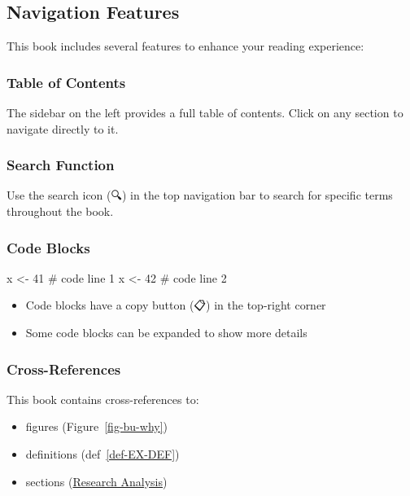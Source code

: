 \documentclass[
  american,
  10,
  a4paper,
]{book}
\newenvironment{Shaded}{\begin{snugshade}}{\end{snugshade}}
\newcommand{\CommentTok}[1]{\textcolor[rgb]{0.37,0.37,0.37}{#1}}
\newcommand{\DecValTok}[1]{\textcolor[rgb]{0.68,0.00,0.00}{#1}}
\newcommand{\NormalTok}[1]{\textcolor[rgb]{0.00,0.23,0.31}{#1}}
\newcommand{\OtherTok}[1]{\textcolor[rgb]{0.00,0.23,0.31}{#1}}
\providecommand{\tightlist}{%
  \setlength{\itemsep}{0pt}\setlength{\parskip}{0pt}}
\theoremstyle{definition}
\theoremstyle{remark}
\begin{document}
\subsection{Navigation Features}\label{navigation-features}

This book includes several features to enhance your reading experience:

\subsubsection{Table of Contents}\label{table-of-contents}

The sidebar on the left provides a full table of contents. Click on any
section to navigate directly to it.

\subsubsection{Search Function}\label{search-function}

Use the search icon (🔍) in the top navigation bar to search for
specific terms throughout the book.

\subsubsection{Code Blocks}\label{code-blocks}

\begin{Shaded}
\begin{Highlighting}[]
\NormalTok{x }\OtherTok{\textless{}{-}} \DecValTok{41}   \CommentTok{\# code line 1}
\NormalTok{x }\OtherTok{\textless{}{-}} \DecValTok{42}   \CommentTok{\# code line 2}
\end{Highlighting}
\end{Shaded}

\begin{itemize}
\tightlist
\item
  Code blocks have a copy button (📋) in the top-right corner
\item
  Some code blocks can be expanded to show more details
\end{itemize}

\subsubsection{Cross-References}\label{cross-references}

This book contains cross-references to:

\begin{itemize}
\tightlist
\item
  figures (Figure~\ref{fig-bu-why})
\item
  definitions (def~\ref{def-EX-DEF})\\
\item
  sections (\href{nb/00_pythias_advice_rev.html}{Research Analysis})
\end{itemize}
\end{document}
